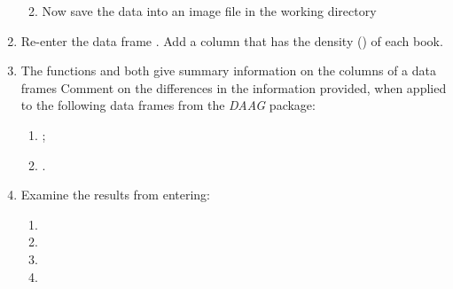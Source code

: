 \begin{enumerate}
\begin{enumerate}
\begin{knitrout}
\begin{kframe}
\begin{alltt}
 \hlopt{~}  
\hlstd{(} \hlopt{~}  
 \hlopt{~}   \hlstd{=}\hlstd{)}
\end{alltt}
\end{kframe}
\end{knitrout}
\item Now save the data into an image file in the working directory
\begin{knitrout}
\color{fgcolor}\begin{kframe}
\begin{alltt}
 \hlstd{=}\hlstd{)}
\end{alltt}
\end{kframe}
\end{knitrout}
\end{enumerate}
\item Re-enter the data frame .
    Add a column that has the density () of each book.
\item The functions  and  both give summary
  information on the columns of a data frames Comment on the differences
  in the information provided, when applied to the following data frames
  from the {\em DAAG} package:
  \begin{enumerate}
    \item {};
    \item {}.
  \end{enumerate}
\item Examine the results from entering:
  \begin{enumerate}
    \item {}
    \item {}
    \item {}
    \item {}

\end{enumerate}
\end{enumerate}
